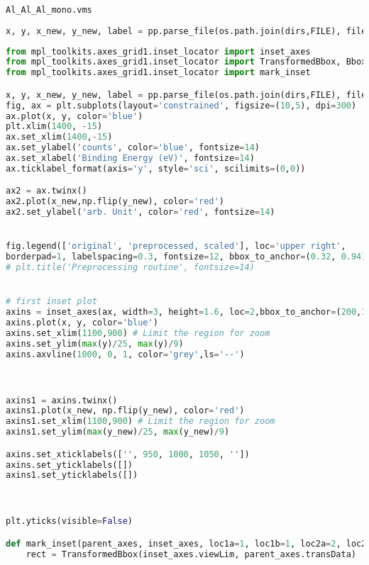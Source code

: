 \begin{lstlisting}
Al_Al_Al_mono.vms
\end{lstlisting}

\begin{lstlisting}[language=Python]
x, y, x_new, y_new, label = pp.parse_file(os.path.join(dirs,FILE), filetype='vms', scale=True, N_points=1024)
\end{lstlisting}

\begin{lstlisting}[language=Python]
from mpl_toolkits.axes_grid1.inset_locator import inset_axes
from mpl_toolkits.axes_grid1.inset_locator import TransformedBbox, BboxPatch, BboxConnector
from mpl_toolkits.axes_grid1.inset_locator import mark_inset

x, y, x_new, y_new, label = pp.parse_file(os.path.join(dirs,FILE), filetype='vms', scale=True, N_points=1024)
fig, ax = plt.subplots(layout='constrained', figsize=(10,5), dpi=300)
ax.plot(x, y, color='blue')
plt.xlim(1400, -15)
ax.set_xlim(1400,-15)
ax.set_ylabel('counts', color='blue', fontsize=14)
ax.set_xlabel('Binding Energy (eV)', fontsize=14)
ax.ticklabel_format(axis='y', style='sci', scilimits=(0,0))

ax2 = ax.twinx()
ax2.plot(x_new,np.flip(y_new), color='red')
ax2.set_ylabel('arb. Unit', color='red', fontsize=14)


fig.legend(['original', 'preprocessed, scaled'], loc='upper right',
borderpad=1, labelspacing=0.3, fontsize=12, bbox_to_anchor=(0.32, 0.94), frameon=True)
# plt.title('Preprocessing routine', fontsize=14)


# first inset plot
axins = inset_axes(ax, width=3, height=1.6, loc=2,bbox_to_anchor=(200,1100)) # zoom = 6
axins.plot(x, y, color='blue')
axins.set_xlim(1100,900) # Limit the region for zoom
axins.set_ylim(max(y)/25, max(y)/9)
axins.axvline(1000, 0, 1, color='grey',ls='--')



axins1 = axins.twinx()
axins1.plot(x_new, np.flip(y_new), color='red')
axins1.set_xlim(1100,900) # Limit the region for zoom
axins1.set_ylim(max(y_new)/25, max(y_new)/9)

axins.set_xticklabels(['', 950, 1000, 1050, ''])
axins.set_yticklabels([])
axins1.set_yticklabels([])



plt.yticks(visible=False)

def mark_inset(parent_axes, inset_axes, loc1a=1, loc1b=1, loc2a=2, loc2b=2, **kwargs):
    rect = TransformedBbox(inset_axes.viewLim, parent_axes.transData)


\end{lstlisting}
